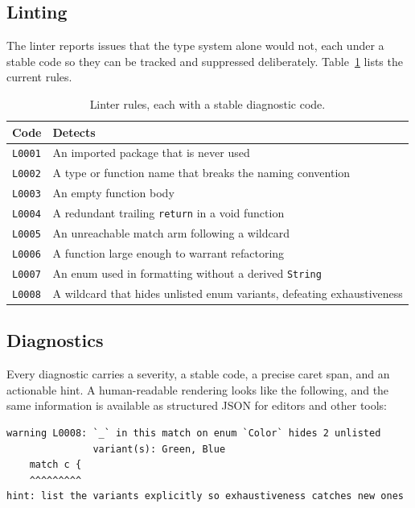 \documentclass[11pt,a4paper]{article}
\begin{document}
\subsection{Linting}
The linter reports issues that the type system alone would not, each under a
stable code so they can be tracked and suppressed deliberately.
Table~\ref{tab:lint} lists the current rules.

\begin{table}[ht]
\centering
\renewcommand{\arraystretch}{1.2}
\begin{tabularx}{\textwidth}{@{}l X@{}}
\toprule
\textbf{\color{hustred}Code} & \textbf{\color{hustred}Detects} \\
\midrule
\texttt{L0001} & An imported package that is never used \\
\texttt{L0002} & A type or function name that breaks the naming convention \\
\texttt{L0003} & An empty function body \\
\texttt{L0004} & A redundant trailing \texttt{return} in a void function \\
\texttt{L0005} & An unreachable match arm following a wildcard \\
\texttt{L0006} & A function large enough to warrant refactoring \\
\texttt{L0007} & An enum used in formatting without a derived \texttt{String} \\
\texttt{L0008} & A wildcard that hides unlisted enum variants, defeating exhaustiveness \\
\bottomrule
\end{tabularx}
\caption{Linter rules, each with a stable diagnostic code.}
\label{tab:lint}
\end{table}

\subsection{Diagnostics}
Every diagnostic carries a severity, a stable code, a precise caret span, and an
actionable hint. A human-readable rendering looks like the following, and the
same information is available as structured JSON for editors and other tools:

\begin{lstlisting}[language=GoPlus,caption={A diagnostic with code, span, and hint.}]
warning L0008: `_` in this match on enum `Color` hides 2 unlisted
               variant(s): Green, Blue
    match c {
    ^^^^^^^^^
hint: list the variants explicitly so exhaustiveness catches new ones
\end{lstlisting}
\end{document}
